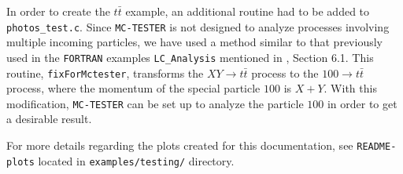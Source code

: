 \documentclass[]{Photos_interface_design}
\begin{document}
In order to create the $t \bar t$ example, an additional routine had to be added to {\tt photos\_test.c}.
Since {\tt MC-TESTER} is not designed to analyze processes involving
multiple incoming particles, we have used a method similar to that previously
used in the {\tt FORTRAN} examples {\tt LC\_Analysis} mentioned in \cite{Golonka:2002rz}, Section 6.1.
This routine, {\tt fixForMctester}, transforms the $X Y \rightarrow t \bar t$
process to the $100 \rightarrow t \bar t$ process,
where the momentum of the
special particle $100$ is $X + Y$. With this modification, {\tt MC-TESTER} can be set
up to analyze the particle $100$ in order to get a desirable result.

For more details regarding the plots created for this documentation, see
{\tt README-plots} located in {\tt examples/testing/} directory.

\end{document}
